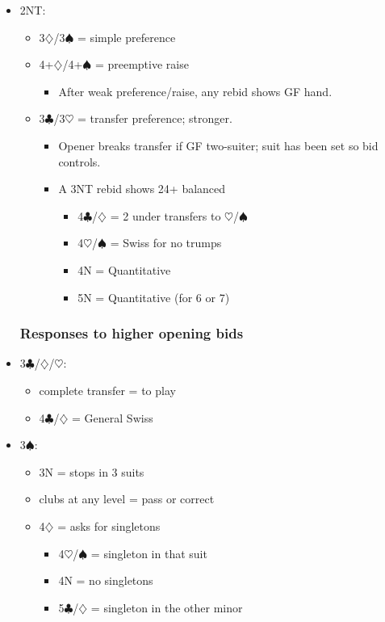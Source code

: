 \documentclass[a4paper,14pt]{extarticle}
\begin{document}
\begin{itemize}
\item 2NT:
	\begin{itemize}
   \item 3$\diamondsuit$/3$\spadesuit$ = simple preference
   \item 4+$\diamondsuit$/4+$\spadesuit$ = preemptive raise
		\begin{itemize}
      \item After weak preference/raise, any rebid shows GF hand.
		\end{itemize}
   \item 3$\clubsuit$/3$\heartsuit$ = transfer preference; stronger.
		\begin{itemize}
      \item Opener breaks transfer if GF two-suiter; suit has been set so bid controls.
      \item A 3NT rebid shows 24+ balanced
			\begin{itemize}
         \item 4$\clubsuit$/$\diamondsuit$ = 2 under transfers to $\heartsuit$/$\spadesuit$
         \item 4$\heartsuit$/$\spadesuit$ = Swiss for no trumps 
         \item 4N = Quantitative
         \item 5N = Quantitative (for 6 or 7)
			\end{itemize}
		\end{itemize}
	\end{itemize}

\subsubsection{Responses to higher opening bids}
\label{sec:resp:higher}

\item 3$\clubsuit$/$\diamondsuit$/$\heartsuit$:
	\begin{itemize}
	\item complete transfer = to play
	\item 4$\clubsuit$/$\diamondsuit$ = General Swiss~
	\end{itemize}

\newpage

\item 3$\spadesuit$:
	\begin{itemize}
	\item 3N = stops in 3 suits
	\item clubs at any level = pass or correct
	\item 4$\diamondsuit$ = asks for singletons
		\begin{itemize}
		\item 4$\heartsuit$/$\spadesuit$ = singleton in that suit
		\item 4N = no singletons
		\item 5$\clubsuit$/$\diamondsuit$ = singleton in the other minor
		\end{itemize}
	\end{itemize}


\end{itemize}
\end{document}
